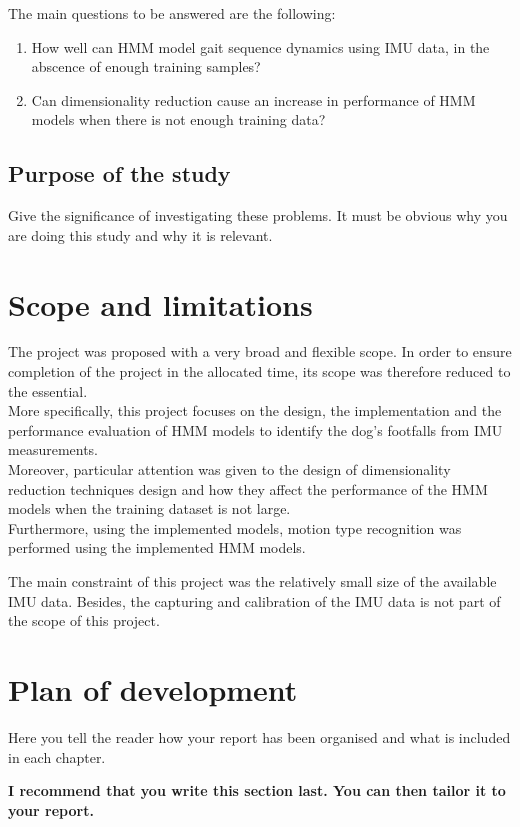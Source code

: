 The main questions to be answered are the following:
\begin{enumerate}
	\item How well can HMM model gait sequence dynamics using IMU data, in the abscence of enough training samples?
	\item Can dimensionality reduction cause an increase in performance of HMM models when there is not enough training data?
\end{enumerate}
\subsection{Purpose of the study}
Give the significance of investigating these problems. It must be obvious why you are doing this study
and why it is relevant.

\section{Scope and limitations}
The project was proposed with a very broad and flexible scope. In order to ensure completion of the project in the allocated time, its scope was therefore reduced to the essential.\\
More specifically, this project focuses on the design, the implementation and the performance evaluation of HMM models to identify the dog's footfalls from IMU measurements.\\
Moreover, particular attention was given to the design of dimensionality reduction techniques design and how they affect the performance of the HMM models when the training dataset is not large.\\
Furthermore, using the implemented models, motion type recognition was performed using the implemented HMM models.

The main constraint of this project was the relatively small size of the available IMU data.  
Besides, the capturing and calibration of the IMU data is not part of the scope of this project.

\section{Plan of development}
Here you tell the reader how your report has been organised and what is included in each
chapter.

{\bf I recommend that you write this section last. You can then tailor it to your report.}
